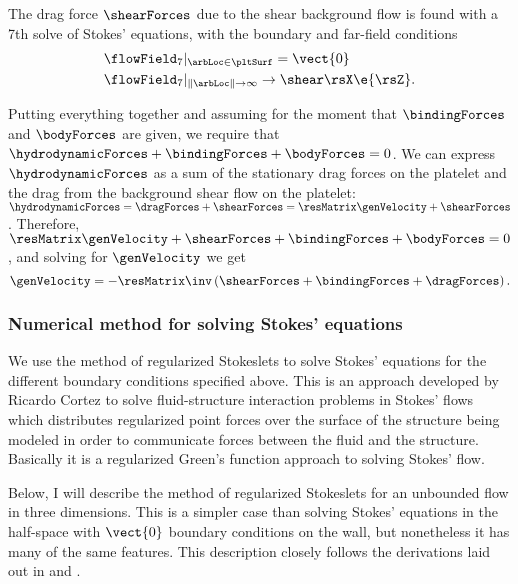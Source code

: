The drag force $\shearForces$ due to the shear background flow is
found with a 7th solve of Stokes' equations, with the boundary and
far-field conditions
\begin{align}
  &\flowField_7 |_{\arbLoc \in \pltSurf} =
  \vect{0} \label{eq:plt-bcs-shear} \\
  &\flowField_7 |_{\|\arbLoc\| \rightarrow \infty} \rightarrow
  \shear \rsX \e{\rsZ}. \label{eq:plt-far-field-shear}
\end{align}

Putting everything together and assuming for the moment that
$\bindingForces$ and $\bodyForces$ are given, we require that
$\hydrodynamicForces + \bindingForces + \bodyForces = 0$. We can
express $\hydrodynamicForces$ as a sum of the stationary drag forces
on the platelet and the drag from the background shear flow on the
platelet: $\hydrodynamicForces = \dragForces + \shearForces =
\resMatrix \genVelocity + \shearForces$. Therefore, $\resMatrix
\genVelocity + \shearForces + \bindingForces + \bodyForces = 0$, and
solving for $\genVelocity$ we get
\begin{equation}
  \label{eq:gen-velocity-equation}
  \genVelocity = -\resMatrix\inv \left(\shearForces + \bindingForces +
    \dragForces \right).
\end{equation}

\subsubsection{Numerical method for solving Stokes' equations}
\label{sec:numer-meth-solv}

We use the method of regularized Stokeslets to solve Stokes' equations
for the different boundary conditions specified above. This is an
approach developed by Ricardo Cortez to solve fluid-structure
interaction problems in Stokes' flows which distributes regularized
point forces over the surface of the structure being modeled in order
to communicate forces between the fluid and the structure. Basically
it is a regularized Green's function approach to solving Stokes' flow.

Below, I will describe the method of regularized Stokeslets for an
unbounded flow in three dimensions. This is a simpler case than
solving Stokes' equations in the half-space with $\vect{0}$
boundary conditions on the wall, but nonetheless it has many of the
same features. This description closely follows the derivations laid
out in \cite{Cortez2001} and \cite{Cortez2005}. %

